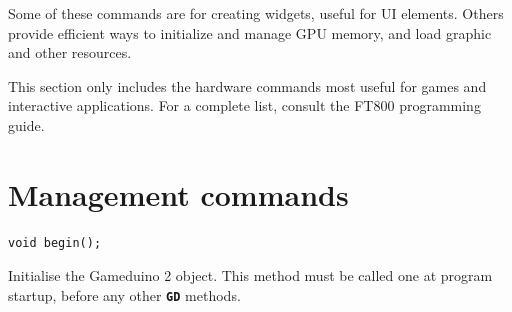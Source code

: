 \documentclass[10pt]{book}
\makeatletter
\newcommand{\gdtwo}{Gameduino 2 }
\newcommand{\mach}[1]{\texttt{\textbf{#1}}}
\newcommand{\cmdidx}[1]{
\index{#1@\mach{#1()}}
}
\newcommand{\cmd}[1]{\cmdidx{cmd\_#1}\nameref{cmd:#1}}
\makeatother
\begin{document}
\begin{CJK}{UTF8}{gkai}

Some of these commands 
are for creating widgets, useful for UI elements.
Others provide efficient ways to initialize and manage GPU memory,
and load graphic and other resources.

This section only includes the hardware commands
most useful for games and interactive applications.
For a complete list, consult the FT800 programming guide.

\newcommand{\highcmd}[2]{
\section{\texttt{cmd\_#1}}
\label{cmd:#1}
\index{cmd\_#1@\mach{cmd\_#1()}|boldindex}
}




\chapter{Management commands}


\begin{framed}
\begin{verbatim}
void begin();
\end{verbatim}
\end{framed}

Initialise the \gdtwo object.
This method must be called one at program startup, before any other \mach{GD} methods.



\end{CJK}
\end{document}
